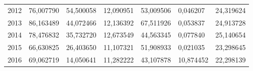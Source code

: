 \begin{table}
\begin{tabular}{p{1cm}p{2cm}p{2cm}p{2cm}p{2cm}p{2cm}p{2cm}}
 2012 &       76,007790 &        54,500058 &               12,090951 & 53,009506 &                0,046207 &                           24,319624 \\
 2013 &       86,163489 &        44,072466 &               12,136392 & 67,511926 &                0,053837 &                           24,913728 \\
 2014 &       78,476832 &        35,732720 &               12,673549 & 44,563345 &                0,077840 &                           25,140654 \\
 2015 &       66,630825 &        26,403650 &               11,107321 & 51,908933 &                0,021035 &                           23,298645 \\
 2016 &       69,062719 &        14,050641 &               11,282222 & 43,107878 &               10,874452 &                           22,298139 \\
\bottomrule
\end{tabular}
\end{table}
